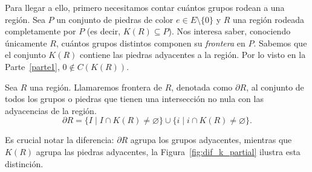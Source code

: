 Para llegar a ello, primero necesitamos contar cuántos grupos rodean a una región. Sea $P$ un conjunto de piedras de color $e \in E \setminus \{0\}$ y $R$ una región rodeada completamente por $P$ (es decir, $K(R) \subseteq P$). Nos interesa saber, conociendo únicamente $R$, cuántos grupos distintos componen su \textit{frontera} en $P$.	Sabemos que el conjunto $K(R)$ contiene las piedras adyacentes a la región. Por lo visto en la Parte~\ref{parte1}, $0 \notin C(K(R))$.
\begin{definition}
	Sea $R$ una región. Llamaremos frontera de $R$, denotada como $\partial R$, al conjunto de todos los grupos o piedras que tienen una intersección no nula con las adyacencias de la región.
	$$ \partial R = \{ I \mid I \cap K(R) \neq \varnothing \}\cup \{ i \mid i \cap K(R) \neq \varnothing \}.$$
\end{definition}
Es crucial notar la diferencia: $\partial R$ agrupa los grupos adyacentes, mientras que $K(R)$ agrupa las piedras adyacentes, la Figura~\ref{fig:dif_k_partial} ilustra esta distinción.
